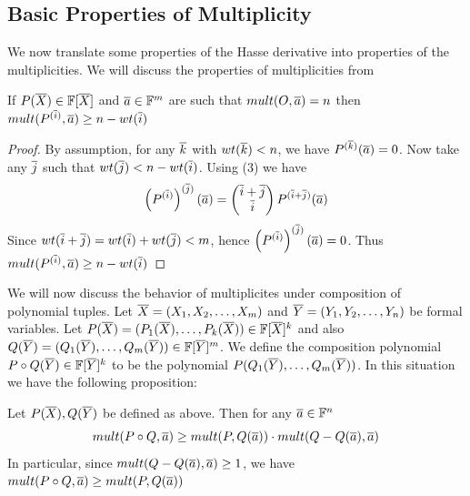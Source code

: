 \subsection{Basic Properties of Multiplicity}
We now translate some properties of the Hasse derivative into properties of the multiplicities. We will discuss the properties of multiplicities from \cite{dvir2009extensions}
\begin{proposition}\label{diffmult}
	If $P(\overline{X})\in \mathbb{F}[\overline{X}]$ and $\overline{a}\in \mathbb{F}^m$ are such that $mult(O,\overline{a})=n$ then $mult(P^{(\overline{i})},\overline{a})\geq n-wt(\overline{i})$
\end{proposition}
\begin{proof}
	By assumption, for any $\overline{k}$ with $wt(\overline{k})<n$, we have $P^{(\overline{k})}(\overline{a})=0$. Now take any $\overline{j}$ such that $wt(\overline{j})<n-wt(\overline{i})$. Using  (3) we have $$\left(P^{(\overline{i})}\right)^{(\overline{j})}(\overline{a})=\left(\begin{matrix} \overline{i}+\overline{j}\\ \overline{i} \end{matrix}\right)P^{(\overline{i}+\overline{j})}(\overline{a})$$Since $wt(\overline{i}+\overline{j})=wt(\overline{i})+wt(\overline{j})<m$, hence $\left(P^{(\overline{i})}\right)^{(\overline{j})}(\overline{a})=0$. Thus $mult(P^{(\overline{i})},\overline{a})\geq n-wt(\overline{i})$
\end{proof}
We will now discuss the behavior of multiplicites under composition of polynomial tuples. Let $\overline{X}=(X_1,X_2,\dots, X_m)$ and $\overline{Y}=(Y_1,Y_2,\dots, Y_n)$ be formal variables. Let $P(\overline{X})=(P_1(\overline{X}),\dots, P_k(\overline{X}))\in \mathbb{F}[\overline{X}]^k$ and also $Q(\overline{Y})=(Q_1(\overline{Y}), \dots, Q_m(\overline{Y}))\in \mathbb{F}[\overline{Y}]^m$. We define the composition polynomial $P\circ Q(\overline{Y})\in \mathbb{F}[\overline{Y}]^k$ to be the polynomial $P(Q_1(\overline{Y}),\dots, Q_m(\overline{Y}))$. In this situation we have the following proposition:
\begin{proposition}\label{composepolymult}
	Let $P(\overline{X}), Q(\overline{Y})$ be defined as above. Then for any $\overline{a}\in \mathbb{F}^n$ $$mult(P\circ Q,\overline{a})\geq mult(P,Q(\overline{a}))\cdot mult(Q-Q(\overline{a}),\overline{a})$$In particular, since $mult(Q-Q(\overline{a}),\overline{a})\geq 1$, we have $mult(P\circ Q,\overline{a})\geq mult(P,Q(\overline{a}))$
\end{proposition}

